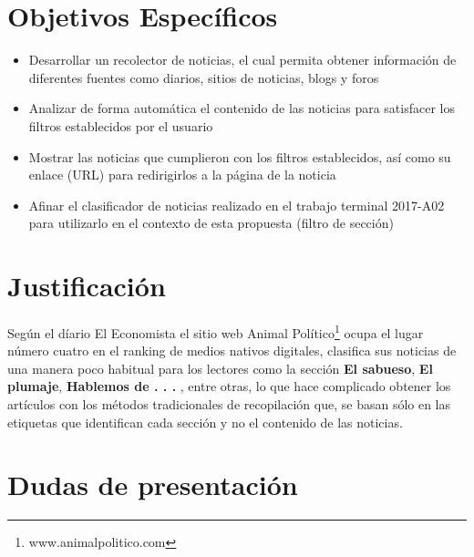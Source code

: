 \section{Objetivos Específicos}

\begin{itemize}

  \item Desarrollar un recolector de noticias, el cual permita obtener información de diferentes fuentes como diarios, sitios de noticias, blogs y foros

  \item Analizar de forma automática el contenido de las noticias para satisfacer los filtros establecidos por el usuario

  \item Mostrar las noticias que cumplieron con los filtros establecidos, así como su enlace (URL) para redirigirlos a la página de la noticia

  \item Afinar el clasificador de noticias realizado en el trabajo terminal 2017-A02 para utilizarlo en el contexto de esta propuesta (filtro de sección) 

\end{itemize}
\section{Justificación}

Según el díario El Economista \citep{SU1} el sitio web Animal Político\footnote{www.animalpolitico.com}
ocupa el lugar número cuatro en el ranking de medios nativos digitales, clasifica sus noticias de una manera poco habitual para los lectores como la sección
\textbf{El sabueso}, \textbf{El plumaje}, \textbf{Hablemos de . . . }, entre otras, lo que hace complicado obtener los artículos con los métodos tradicionales 
de recopilación que, se basan sólo en las etiquetas que identifican cada sección y no el contenido de las noticias.


\section{Dudas de presentación}
 
